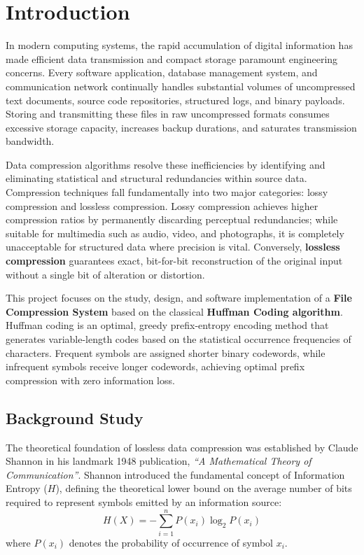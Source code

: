 \documentclass[12pt,a4paper]{article}
\begin{document}
\setcounter{page}{1}

\section{Introduction}

In modern computing systems, the rapid accumulation of digital information has made efficient data transmission and compact storage paramount engineering concerns. Every software application, database management system, and communication network continually handles substantial volumes of uncompressed text documents, source code repositories, structured logs, and binary payloads. Storing and transmitting these files in raw uncompressed formats consumes excessive storage capacity, increases backup durations, and saturates transmission bandwidth.

Data compression algorithms resolve these inefficiencies by identifying and eliminating statistical and structural redundancies within source data. Compression techniques fall fundamentally into two major categories: lossy compression and lossless compression. Lossy compression achieves higher compression ratios by permanently discarding perceptual redundancies; while suitable for multimedia such as audio, video, and photographs, it is completely unacceptable for structured data where precision is vital. Conversely, \textbf{lossless compression} guarantees exact, bit-for-bit reconstruction of the original input without a single bit of alteration or distortion.

This project focuses on the study, design, and software implementation of a \textbf{File Compression System} based on the classical \textbf{Huffman Coding algorithm}. Huffman coding is an optimal, greedy prefix-entropy encoding method that generates variable-length codes based on the statistical occurrence frequencies of characters. Frequent symbols are assigned shorter binary codewords, while infrequent symbols receive longer codewords, achieving optimal prefix compression with zero information loss.

\subsection{Background Study}
The theoretical foundation of lossless data compression was established by Claude Shannon in his landmark 1948 publication, \textit{``A Mathematical Theory of Communication''}. Shannon introduced the fundamental concept of Information Entropy ($H$), defining the theoretical lower bound on the average number of bits required to represent symbols emitted by an information source:
\begin{equation}
H(X) = -\sum_{i=1}^{n} P(x_i) \log_2 P(x_i)
\end{equation}
where $P(x_i)$ denotes the probability of occurrence of symbol $x_i$.
\end{document}

